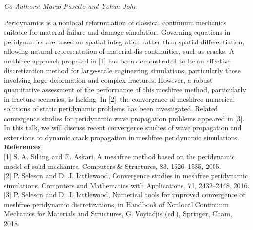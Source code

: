 \begin{center}
\textit{Co-Authors: Marco Pasetto and Yohan John}
\end{center} 
Peridynamics is a nonlocal reformulation of classical continuum mechanics suitable for material failure and damage simulation. Governing equations in peridynamics are based on spatial integration rather than spatial differentiation, allowing natural representation of material dis-continuities, such as cracks. A meshfree approach proposed in [1] has been demonstrated to be an effective discretization method for large-scale engineering simulations, particularly those involving large deformation and complex fractures. However, a robust quantitative assessment of the performance of this meshfree method, particularly in fracture scenarios, is lacking. In [2], the convergence of meshfree numerical solutions of static peridynamic problems has been investigated. Related convergence studies for peridynamic wave propagation problems appeared in [3]. In this talk, we will discuss recent convergence studies of wave propagation and extensions to dynamic crack propagation in meshfree peridynamic simulations.\\

\noindent\textbf{References}\\
$[$1$]$ S. A. Silling and E. Askari, A meshfree method based on the peridynamic model of solid mechanics, Computers \& Structures, 83, 1526–1535, 2005.\\\newline
$[$2$]$ P. Seleson and D. J. Littlewood, Convergence studies in meshfree peridynamic simulations, Computers and Mathematics with Applications, 71, 2432–2448, 2016.\\\newline
$[$3$]$ P. Seleson and D. J. Littlewood, Numerical tools for improved convergence of meshfree peridynamic discretizations, in Handbook of Nonlocal Continuum Mechanics for Materials and Structures, G. Voyiadjis (ed.), Springer, Cham, 2018.
